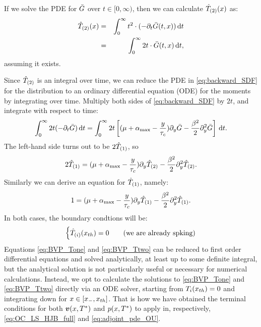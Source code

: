 If we solve the PDE for ${ \bar{G} }$ over $t \in [0,\infty)$, then we can calculate
${ \hat{T}_{(2)} }(x)$ as:
\begin{eqnarray}
{ \hat{T}_{(2)} }(x) &=& \int_0^\infty t^2 \cdot (-{\partial}_t{ \bar{G} }(t,x)) \, \mathrm{d} t
\\
		   &=& \int_0^\infty 2t \cdot { \bar{G} }(t,x) \, \mathrm{d} t,
\end{eqnarray}
assuming it exists.

Since ${ \hat{T}_{(2)} }$ is an integral over time, we can reduce the PDE in
\cref{eq:backward_SDF} for the distribution to an ordinary differential equation
(ODE) for the moments by integrating over time. Multiply both sides of
\cref{eq:backward_SDF} by $2t$, and integrate with respect to time:
\begin{equation}
\int_0^\infty 2t (-{\partial}_t { \bar{G} }) \, \mathrm{d} t
=
\int_0^\infty  2t \left[ ({\mu } + { \alpha_{\textrm{max}} } - \frac y{\tau_c}) {\partial}_y{ \bar{G} } - \frac {\beta^2} 2
{\partial}_y^2 { \bar{G} }\right]
\, \mathrm{d} t.
\end{equation}
The left-hand side turns out to be $2{ \hat{T}_{(1)} }$, so
\begin{equation}  
2{ \hat{T}_{(1)} }
=({\mu } + { \alpha_{\textrm{max}} } - \frac y{\tau_c})   {\partial}_y { \hat{T}_{(2)} }
- \frac {\beta^2} 2
{\partial}_y^2 { \hat{T}_{(2)} }.
\label{eq:BVP_Ttwo}
\end{equation}
Similarly we can derive an equation for ${ \hat{T}_{(1)} }$, namely:
\begin{equation}
1
=({\mu } + { \alpha_{\textrm{max}} } - \frac y{\tau_c})   {\partial}_y { \hat{T}_{(1)} }
- \frac {\beta^2} 2
{\partial}_y^2 { \hat{T}_{(1)} }.
\label{eq:BVP_Tone}
\end{equation}
In both cases, the boundary condtions will be:
\begin{equation}
\begin{cases}
{ \hat{T}_{(i)} }({ x_{th} }) = 0 & \quad (\textrm{we are already spking})
\end{cases}
\label{eq:BVP_Ti_BCs}
\end{equation}
Equations \ref{eq:BVP_Tone} and \ref{eq:BVP_Ttwo} can be reduced to first order
differential equations and solved analytically, at least up to some definite integral,
but the analytical solution is not particularly useful or necessary for
numerical calculations. Instead, we opt to calculate the solutions to
\ref{eq:BVP_Tone} and \ref{eq:BVP_Ttwo} directly via an ODE solver, starting
from $T_i({ x_{th} }) = 0$ and integrating down for $x  \in [{ x_{-} }, { x_{th} }]$.
That is how we have obtained the terminal conditions for both ${ \boldsymbol{v} }(x,{ T^* })$ and
$p(x,{ T^* })$ to apply in, respectively, \cref{eq:OC_LS_HJB_full} and
\cref{eq:adjoint_pde_OU}.

